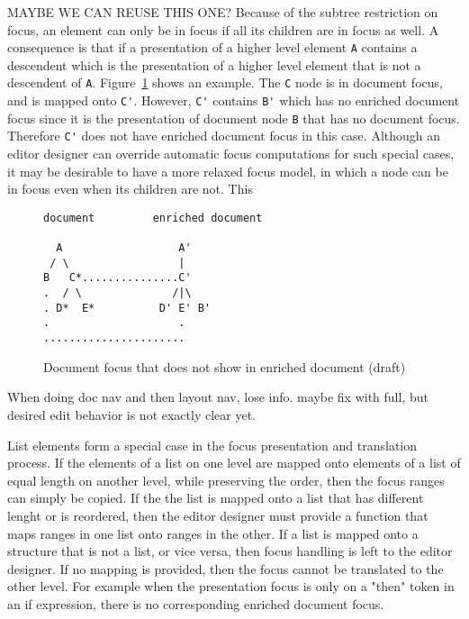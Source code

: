 \bc MAYBE WE CAN REUSE THIS ONE?
Because of the subtree restriction on focus, an element can only be in focus if all its children are in focus as well.  A consequence is that if a presentation of a higher level element \verb|A| contains a descendent which is the presentation of a higher level element that is not a descendent of \verb|A|. Figure~\ref{unpresentableFocus} shows an example. The \verb|C| node is in document focus, and is mapped onto \verb|C'|. However, \verb|C'| contains \verb|B'| which has no enriched document focus since it is the presentation of document node \verb|B| that has no document focus. Therefore \verb|C'| does not have enriched document focus in this case. Although an editor designer can override automatic focus computations for such special cases, it may be desirable to have a more relaxed focus model, in which a node can be in focus even when its children are not. This 

\begin{figure}
\begin{small}
\begin{center}
\begin{verbatim}
document         enriched document

  A                  A'
 / \                 |
B   C*...............C'
.  / \              /|\
. D*  E*          D' E' B'
.                    .
......................    
\end{verbatim}
\caption{Document focus that does not show in enriched document (draft)}\label{unpresentableFocus} 
\end{center}
\end{small}
\end{figure}
\ec

\bc When doing doc nav and then layout nav, lose info. maybe fix with full, but desired edit behavior is not exactly clear yet.
\ec

List elements form a special case in the focus presentation and translation process. If the elements of a list on one level are mapped onto elements of a list of equal length on another level, while preserving the order, then the focus ranges can simply be copied. If the the list is mapped onto a list that has different lenght or is reordered, then the editor designer must provide a function that maps ranges in one list onto ranges in the other. If a list is mapped onto a structure that is not a list, or vice versa, then focus handling is left to the editor designer. If no mapping is provided, then the focus cannot be translated to the other level. For example when the presentation focus is only on a "then" token in an if expression, there is no corresponding enriched document focus.


